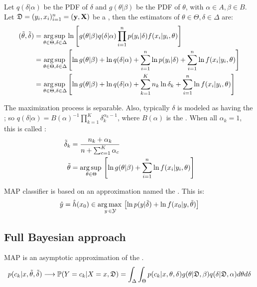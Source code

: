 Let $q(\delta|\alpha)$ be the PDF of $\delta$ and $g(\theta|\beta)$ be the PDF of $\theta$, with  $\alpha\in A, \beta\in B$. Let $\mathfrak{D}=(y_i,x_i)_{i=1}^n=(\vb{y},\vb{X})$ be a , then the  estimators of $\theta\in\Theta, \delta\in\Delta$ are:
\begin{align*}
    (\Tilde{\theta}, \Tilde{\delta}) 
    &= \operatorname*{arg\,sup\,}_{\theta\in\Theta, \delta\in\Delta} \ln\left[g(\theta|\beta)q(\delta|\alpha) \prod_{i=1}^np(y_i|\delta) f(x_i|y_i,\theta) \right]\\
    &= \operatorname*{arg\,sup\,}_{\theta\in\Theta, \delta\in\Delta} \left[\ln g(\theta|\beta)+\ln q(\delta|\alpha)+\sum_{i=1}^n\ln p(y_i|\delta)+\sum_{i=1}^n\ln f(x_i|y_i,\theta)\right]
    \\
    &= \operatorname*{arg\,sup\,}_{\theta\in\Theta, \delta\in\Delta} \left[\ln g(\theta|\beta)+\ln q(\delta|\alpha)+\sum_{k=1}^Kn_k\ln \delta_k+\sum_{i=1}^n\ln f(x_i|y_i,\theta)\right]
\end{align*}

The maximization process is separable. Also, typically $\delta$ is modeled as having the ; so $q(\delta|\alpha)=B(\alpha)^{-1}\prod_{k=1}^K \delta_k^{\alpha_k-1}$, where $B(\alpha)$ is the . When all $\alpha_k=1$, this is called :
\begin{align*}
    \Tilde{\delta}_k &= \frac{n_k+\alpha_k}{n+\sum_{c=1}^K\alpha_c} \\
    \Tilde{\theta} &= \operatorname*{arg\,sup\,}_{\theta\in\Theta} \left[\ln g(\theta|\beta)+\sum_{i=1}^n\ln f(x_i|y_i,\theta)\right]
\end{align*}

MAP classifier is based on an approximation named the . This is:
\begin{equation*}
    \hat{y}=\hat{h}(x_0) \in \operatorname*{arg\,max\,}_{y\,\in\mathcal{Y}}\left[ \ln p(y|\Tilde{\delta})+\ln f(x_0|y,\Tilde{\theta})\right]
\end{equation*}

\subsection{Full Bayesian approach}
MAP is an asymptotic approximation  of the . 
\begin{equation*}
   p(c_k|x,\Tilde{\theta},\Tilde{\delta}) \longrightarrow \operatorname{\mathbb{P}}(Y=c_k|X=x,\mathfrak{D}) = \int_{\Delta}\int_{\Theta}p(c_k|x,\theta,\delta)g(\theta|\mathfrak{D},\beta)q(\delta|\mathfrak{D},\alpha)d\theta d\delta
\end{equation*}

